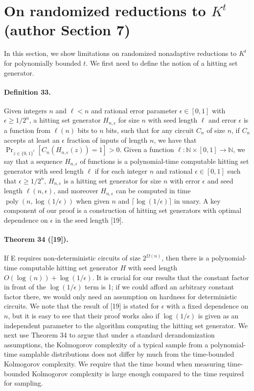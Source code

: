 \section*{On randomized reductions to $K^t$ (author Section 7)}
In this section, we show limitations on randomized nonadaptive reductions to $K^t$ for polynomially bounded $t$. We first need to define the notion of a hitting set generator.
\paragraph{Definition 33.} Given integers $n$ and $\ell<n$ and rational error parameter $\epsilon\in[0,1]$ with $\epsilon\ge1/2^n$, a hitting set generator $H_{n,\epsilon}$ for size $n$ with seed length $\ell$ and error $\epsilon$ is a function from $\ell(n)$ bits to $n$ bits, such that for any circuit $C_n$ of size $n$, if $C_n$ accepts at least an $\epsilon$ fraction of inputs of length $n$, we have that $\Pr_{z\in\{0,1\}^\ell}[C_n(H_{n,\epsilon}(z))=1]>0$. Given a function $\ell:\mathbb N\times[0,1]\to\mathbb N$, we say that a sequence $H_{n,\epsilon}$ of functions is a polynomial-time computable hitting set generator with seed length $\ell$ if for each integer $n$ and rational $\epsilon\in[0,1]$ such that $\epsilon\ge1/2^n$, $H_{n,\epsilon}$ is a hitting set generator for size $n$ with error $\epsilon$ and seed length $\ell(n,\epsilon)$, and moreover $H_{n,\epsilon}$ can be computed in time $\operatorname{poly}(n,\log(1/\epsilon))$ when given $n$ and $\lceil\log(1/\epsilon)\rceil$ in unary.
A key component of our proof is a construction of hitting set generators with optimal dependence on $\epsilon$ in the seed length [19].
\paragraph{Theorem 34 ([19]).} If E requires non-deterministic circuits of size $2^{\Omega(n)}$, then there is a polynomial-time computable hitting set generator $H$ with seed length $O(\log(n))+\log(1/\epsilon)$.
It is crucial for our results that the constant factor in front of the $\log(1/\epsilon)$ term is 1; if we could afford an arbitrary constant factor there, we would only need an assumption on hardness for deterministic circuits. We note that the result of [19] is stated for $\epsilon$ with a fixed dependence on $n$, but it is easy to see that their proof works also if $\log(1/\epsilon)$ is given as an independent parameter to the algorithm computing the hitting set generator.
We next use Theorem 34 to argue that under a standard derandomization assumptions, the Kolmogorov complexity of a typical sample from a polynomial-time samplable distributions does not differ by much from the time-bounded Kolmogorov complexity. We require that the time bound when measuring time-bounded Kolmogorov complexity is large enough compared to the time required for sampling.
